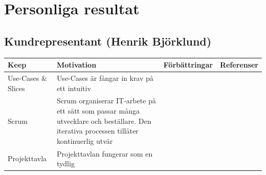 \documentclass[conference,a4paper]{IEEEtran}
\newcommand\Tstrut{\rule{0pt}{2.6ex}}       %
\newcommand\Bstrut{\rule[-0.9ex]{0pt}{0pt}} %
\newcommand{\TBstrut}{\Tstrut\Bstrut} %
\begin{document}


%
%
%







\appendices
\section{Personliga resultat}

\subsection{Kundrepresentant (Henrik Björklund)}
\begin{table}[H]
	\small
  \centering
	\begin{tabular}{|p{1.5cm}|p{2cm}|p{1.8cm}|p{1.5cm}|} %
    \hline
    Keep & Motivation & Förbättringar & Referenser \TBstrut \\
    \hline
    Use-Cases \& Slices & Use-Cases är fångar in krav på ett intuitiv & & \TBstrut \\
    \hline
    Scrum & Scrum organiserar IT-arbete på ett sätt som passar många utvecklare och beställare. Den iterativa processen tillåter kontinuerlig utvär & & \TBstrut \\
    \hline
    Projekttavla & Projekttavlan fungerar som en tydlig & & \TBstrut \\
    \hline
  \end{tabular}
\end{table}
\end{document}
